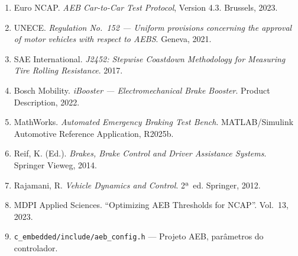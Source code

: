 \documentclass[12pt,a4paper]{article}
\begin{document}
\begin{enumerate}
  \item Euro NCAP. \textit{AEB Car-to-Car Test Protocol}, Version 4.3. Brussels, 2023.

  \item UNECE. \textit{Regulation No.~152 --- Uniform provisions concerning the approval
        of motor vehicles with respect to AEBS}. Geneva, 2021.

  \item SAE International. \textit{J2452: Stepwise Coastdown Methodology for Measuring
        Tire Rolling Resistance}. 2017.

  \item Bosch Mobility. \textit{iBooster --- Electromechanical Brake Booster}.
        Product Description, 2022.

  \item MathWorks. \textit{Automated Emergency Braking Test Bench}.
        MATLAB/Simulink Automotive Reference Application, R2025b.

  \item Reif, K. (Ed.). \textit{Brakes, Brake Control and Driver Assistance Systems}.
        Springer Vieweg, 2014.

  \item Rajamani, R. \textit{Vehicle Dynamics and Control}. 2ª~ed. Springer, 2012.

  \item MDPI Applied Sciences. ``Optimizing AEB Thresholds for NCAP''. Vol.~13, 2023.

  \item \texttt{c\_embedded/include/aeb\_config.h} --- Projeto AEB, parâmetros do controlador.
\end{enumerate}
\end{document}

